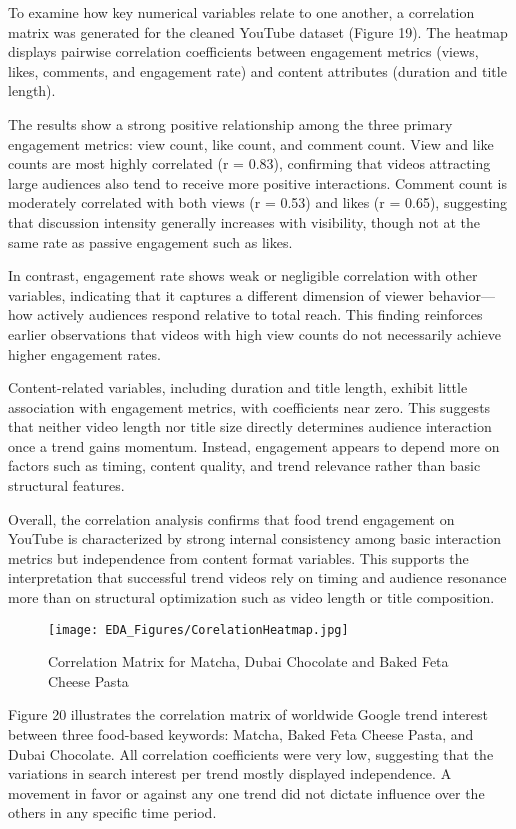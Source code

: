 \documentclass{article}
\begin{document}
To examine how key numerical variables relate to one another, a correlation matrix was generated for the cleaned YouTube dataset (Figure 19). The heatmap displays pairwise correlation coefficients between engagement metrics (views, likes, comments, and engagement rate) and content attributes (duration and title length).

The results show a strong positive relationship among the three primary engagement metrics: view count, like count, and comment count. View and like counts are most highly correlated (r = 0.83), confirming that videos attracting large audiences also tend to receive more positive interactions. Comment count is moderately correlated with both views (r = 0.53) and likes (r = 0.65), suggesting that discussion intensity generally increases with visibility, though not at the same rate as passive engagement such as likes.

In contrast, engagement rate shows weak or negligible correlation with other variables, indicating that it captures a different dimension of viewer behavior—how actively audiences respond relative to total reach. This finding reinforces earlier observations that videos with high view counts do not necessarily achieve higher engagement rates.

Content-related variables, including duration and title length, exhibit little association with engagement metrics, with coefficients near zero. This suggests that neither video length nor title size directly determines audience interaction once a trend gains momentum. Instead, engagement appears to depend more on factors such as timing, content quality, and trend relevance rather than basic structural features.

Overall, the correlation analysis confirms that food trend engagement on YouTube is characterized by strong internal consistency among basic interaction metrics but independence from content format variables. This supports the interpretation that successful trend videos rely on timing and audience resonance more than on structural optimization such as video length or title composition.

\begin{figure}[H]
    \centering
    \texttt{[image: EDA\_Figures/CorelationHeatmap.jpg]}
    \caption{Correlation Matrix for Matcha, Dubai Chocolate and Baked Feta Cheese Pasta}
    \label{fig:engagement_age}
\end{figure}

Figure 20 illustrates the correlation matrix of worldwide Google trend interest between three food-based keywords: Matcha, Baked Feta Cheese Pasta, and Dubai Chocolate. All correlation coefficients were very low, suggesting that the variations in search interest per trend mostly displayed independence. A movement in favor or against any one trend did not dictate influence over the others in any specific time period.
\end{document}
